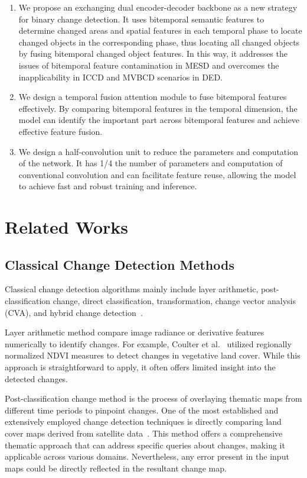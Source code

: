 \documentclass[journal]{IEEEtran}
\begin{document}
\begin{enumerate}

    \item We propose an exchanging dual encoder-decoder backbone as a new strategy for binary change detection. It uses bitemporal semantic features to determine changed areas and spatial features in each temporal phase to locate changed objects in the corresponding phase, thus locating all changed objects by fusing bitemporal changed object features. In this way, it addresses the issues of bitemporal feature contamination in MESD and overcomes the inapplicability in ICCD and MVBCD scenarios in DED.

    \item We design a temporal fusion attention module to fuse bitemporal features effectively. By comparing bitemporal features in the temporal dimension, the model can identify the important part across bitemporal features and achieve effective feature fusion.

    \item We design a half-convolution unit to reduce the parameters and computation of the network. It has 1/4 the number of parameters and computation of conventional convolution and can facilitate feature reuse, allowing the model to achieve fast and robust training and inference.
\end{enumerate}


\section{Related Works}

\subsection{Classical Change Detection Methods}

Classical change detection algorithms mainly include layer arithmetic, post-classification change, direct classification, transformation, change vector analysis (CVA), and hybrid change detection~\cite{tcd}. 

Layer arithmetic method compare image radiance or derivative features numerically to identify changes. For example, Coulter et al.~\cite{la1} utilized regionally normalized NDVI measures to detect changes in vegetative land cover. While this approach is straightforward to apply, it often offers limited insight into the detected changes.

Post-classification change method is the process of overlaying thematic maps from different time periods to pinpoint changes. One of the most established and extensively employed change detection techniques is directly comparing land cover maps derived from satellite data~\cite{pc1,pc2}. This method offers a comprehensive thematic approach that can address specific queries about changes, making it applicable across various domains. Nevertheless, any error present in the input maps could be directly reflected in the resultant change map.
\end{document}
